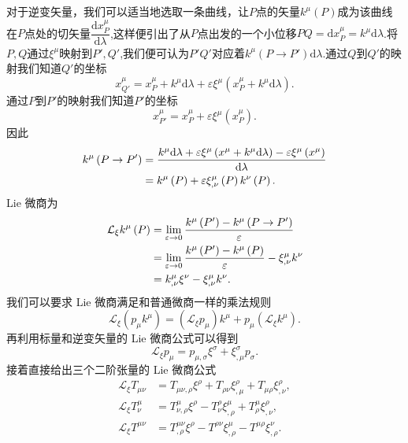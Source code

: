\documentclass[11pt, a4paper, oneside, onecolumn]{ctexart}
\numberwithin{equation}{subsection}
\begin{document}
对于逆变矢量，我们可以适当地选取一条曲线，让$P$点的矢量$k^{\mu}\left(P\right)$成为该曲线在$P$点处的切矢量$\dfrac{\mathrm{d}x^{\mu}_{P}}{\mathrm{d}\lambda}$,这样便引出了从$P$点出发的一个小位移$PQ=\mathrm{d}x^{\mu}_{P}=k^{\mu}\mathrm{d}\lambda$.将$P,Q$通过$\xi^{\mu}$映射到$P',Q'$,我们便可认为$P'Q'$对应着$k^{\mu}\left(P\to P'\right)\mathrm{d}\lambda$.通过$Q$到$Q'$的映射我们知道$Q'$的坐标
\begin{equation}
x^{\mu}_{Q'}=x^{\mu}_{P}+k^{\mu}\mathrm{d}\lambda+\varepsilon\xi^{\mu}\left(x^{\mu}_{P}+k^{\mu}\mathrm{d}\lambda\right).
\end{equation}
通过$P$到$P'$的映射我们知道$P'$的坐标
\begin{equation}
x^{\mu}_{P'}=x^{\mu}_{P}+\varepsilon\xi^{\mu}\left(x^{\mu}_{P}\right).
\end{equation}
因此
\begin{align}
k^{\mu}\left(P\to P'\right)&=\frac{k^{\mu}\mathrm{d}\lambda+\varepsilon\xi^{\mu}\left(x^{\mu}+k^{\mu}\mathrm{d}\lambda\right)-\varepsilon\xi^{\mu}\left(x^{\mu}\right)}{\mathrm{d}\lambda}\notag\\
&=k^{\mu}\left(P\right)+\varepsilon\xi^{\mu}_{,\nu}\left(P\right)k^{\nu}\left(P\right).\label{1.11.6}
\end{align}
Lie 微商为
\begin{align}
\mathcal{L}_{\xi}k^{\mu}\left(P\right)&=\lim_{\varepsilon\to0}\frac{k^{\mu}\left(P'\right)-k^{\mu}\left(P\to P'\right)}{\varepsilon}\notag\\
&=\lim_{\varepsilon\to0}\frac{k^{\mu}\left(P'\right)-k^{\mu}\left(P\right)}{\varepsilon}-\xi^{\mu}_{,\nu}k^{\nu}\notag\\
&=k^{\mu}_{,\nu}\xi^{\nu}-\xi^{\mu}_{,\nu}k^{\nu}.
\end{align}
我们可以要求 Lie 微商满足和普通微商一样的乘法规则
\begin{equation}
\mathcal{L}_{\xi}\left(p_{\mu}k^{\mu}\right)=\left(\mathcal{L}_{\xi}p_{\mu}\right)k^{\mu}+p_{\mu}\left(\mathcal{L}_{\xi}k^{\mu}\right).
\end{equation}
再利用标量和逆变矢量的 Lie 微商公式可以得到
\begin{equation}
\mathcal{L}_{\xi}p_{\mu}=p_{\mu,\sigma}\xi^{\sigma}+\xi^{\sigma}_{,\mu}p_{\sigma}.
\end{equation}
接着直接给出三个二阶张量的 Lie 微商公式
\begin{align}
\mathcal{L}_{\xi}T_{\mu\nu}&=T_{\mu\nu,\rho}\xi^{\rho}+T_{\rho\nu}\xi^{\rho}_{,\mu}+T_{\mu\rho}\xi^{\rho}_{,\nu},\\
\mathcal{L}_{\xi}T^{\mu}_{\nu}&=T^{\mu}_{\nu,\rho}\xi^{\rho}-T^{\rho}_{\nu}\xi^{\mu}_{,\rho}+T^{\mu}_{\rho}\xi^{\rho}_{,\nu},\\
\mathcal{L}_{\xi}T^{\mu\nu}&=T^{\mu\nu}_{,\rho}\xi^{\rho}-T^{\rho\nu}\xi^{\mu}_{,\rho}-T^{\mu\rho}\xi^{\nu}_{,\rho}.
\end{align}
\end{document}
